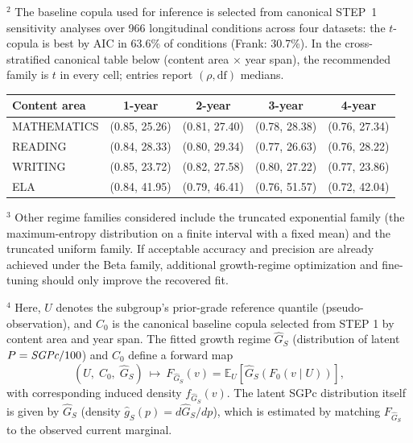\documentclass[10pt]{article}
\begin{document}
\noindent
\hspace{0.25in}%
\begin{minipage}[t]{7.55in}
{\footnotesize%
$^{2}$ The baseline copula used for inference is selected from canonical STEP~1 sensitivity analyses
over 966 longitudinal conditions across four datasets: the $t$-copula is best by AIC in
63.6\% of conditions (Frank: 30.7\%). In the cross-stratified canonical table below
(content area $\times$ year span), the recommended family is $t$ in every cell; entries
report $(\rho,\mathrm{df})$ medians.

\vspace{2pt}
\begin{center}
\begin{tabular}{@{}lcccc@{}}
\textbf{Content area} & \textbf{1-year} & \textbf{2-year} & \textbf{3-year} & \textbf{4-year} \\
\hline
\noalign{\vspace{2pt}}
MATHEMATICS & (0.85, 25.26) & (0.81, 27.40) & (0.78, 28.38) & (0.76, 27.34) \\
READING     & (0.84, 28.33) & (0.80, 29.34) & (0.77, 26.63) & (0.76, 28.22) \\
WRITING     & (0.85, 23.72) & (0.82, 27.58) & (0.80, 27.22) & (0.77, 23.86) \\
ELA         & (0.84, 41.95) & (0.79, 46.41) & (0.76, 51.57) & (0.72, 42.04) \\
\end{tabular}
\end{center}

\vspace{6pt}
$^{3}$ Other regime families considered include the truncated exponential family
(the maximum-entropy distribution on a finite interval with a fixed mean) and the
truncated uniform family. If acceptable accuracy and precision are already achieved
under the Beta family, additional growth-regime optimization and fine-tuning should
only improve the recovered fit.

\vspace{4pt}
$^{4}$ Here, $U$ denotes the subgroup’s prior-grade reference quantile (pseudo-observation), 
and $C_0$ is the canonical baseline copula selected from STEP 1 by content area and year span. 
The fitted growth regime $\widehat{G}_S$ (distribution of latent $P=\textit{SGPc}/100$) and $C_0$ 
define a forward map \[ (U,\;C_0,\;\widehat{G}_S)\ \longmapsto\ F_{\widehat{G}_S}(v)=\mathbb{E}_U\!\left[\widehat{G}_S\!\left(F_0(v\mid U)\right)\right], \] 
with corresponding induced density $f_{\widehat{G}_S}(v)$. The latent SGPc distribution itself 
is given by $\widehat{G}_S$ (density $\widehat{g}_S(p)=d\widehat{G}_S/dp$), which is estimated 
by matching $F_{\widehat{G}_S}$ to the observed current marginal.

}
\end{minipage}
\end{document}
